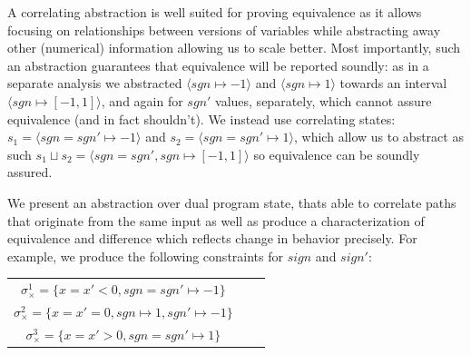 A correlating abstraction is well suited for proving equivalence as it allows focusing on relationships between versions of variables while abstracting away other (numerical) information allowing us to scale better. Most importantly, such an abstraction guarantees that equivalence will be reported soundly: as in a separate analysis we abstracted $\langle sgn \mapsto -1 \rangle$ and $\langle sgn \mapsto 1 \rangle$ towards an interval $\langle sgn \mapsto [-1,1] \rangle$, and again for $sgn'$ values, separately, which cannot assure equivalence (and in fact shouldn't). We instead use correlating states: $s_1 = \langle sgn = sgn' \mapsto -1 \rangle$ and $s_2 = \langle sgn = sgn' \mapsto 1 \rangle$, which allow us to abstract as such $s_1 \sqcup s_2 = \langle sgn = sgn', sgn \mapsto [-1,1] \rangle$ so equivalence can be soundly assured.


We present an abstraction over dual program state, thats able to correlate paths that originate from the same input as well as produce a characterization of equivalence and difference which reflects change in behavior precisely. For example, we produce the following constraints for $sign$ and $sign'$:
\\
\begin{tabular}{ccc}
\hspace{1cm} $\sigma_{\times}^1 = \{x = x' < 0, sgn = sgn' \mapsto -1\}$
\\
\hspace{1cm} $\sigma_{\times}^2 = \{x = x' = 0, sgn \mapsto 1, sgn' \mapsto -1\}$
\\
\hspace{1cm} $\sigma_{\times}^3 = \{x = x' > 0, sgn = sgn' \mapsto 1\}$
\\
\end{tabular}
\\

